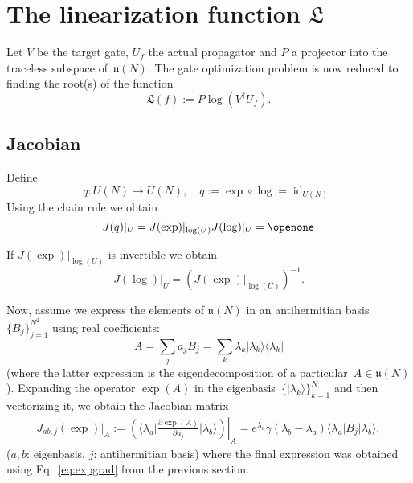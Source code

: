 \documentclass[aps,pra,12pt,showpacs,showkeys,nofootinbib,superscriptaddress,longbibliography]{revtex4}
\newcommand{\bra}[1]{\mbox{$\langle #1|$}}
\newcommand{\ket}[1]{\mbox{$|#1\rangle$}}
\newcommand{\ketbra}[2]{\mbox{$|#1\rangle\langle #2|$}}
\DeclareMathOperator{\id}{id} %
\newcommand{\I}{\openone}     %
\newcommand{\mf}[1]{\mathfrak{#1}}
\newcommand{\pde}[2]{\frac{\partial #1}{\partial #2}}
\newcommand{\be}{\begin{equation}}
\newcommand{\ee}{\end{equation}}
\begin{document}
\section{The linearization function $\mf{L}$}



Let $V$ be the target gate, $U_f$ the actual propagator and $P$ a
projector into the traceless subspace of~$\mf{u}(N)$. The gate
optimization problem is now reduced to finding the root(s) of the function
\be
\mf{L}(f) := P \log(V^\dagger U_f).
\ee




\subsection{Jacobian}


Define
\be
q: U(N) \to U(N), \quad q := \exp \circ \log = \id_{U(N)}.
\ee
Using the chain rule we obtain
\be
J(q)|_{U} = J(\exp)|_{\log(U)} J(\log)|_{U} = \I
\ee

If $J(\exp)|_{\log(U)}$ is invertible we obtain
\be
\label{eq:invJ}
J(\log)|_{U} =  (J(\exp)|_{\log(U)})^{-1}.
\ee

Now, assume we express the elements of
$\mf{u}(N)$
in an antihermitian basis~$\{B_j\}_{j=1}^{N^2}$ using real coefficients:
\be
A = \sum_j a_j B_j = \sum_k \lambda_k \ketbra{\lambda_k}{\lambda_k}
\ee
(where the latter expression is the eigendecomposition of a
particular~$A \in \mf{u}(N)$).
Expanding the operator $\exp(A)$ in the eigenbasis~$\{\ket{\lambda_k}\}_{k=1}^N$ and then vectorizing it, we
obtain the Jacobian matrix
\begin{align}
J_{ab,j}(\exp)|_A
:= \left.\left(\bra{\lambda_a}  \pde{\exp(A)}{a_j} \ket{\lambda_b} \right) \right|_A
= e^{\lambda_a} \gamma(\lambda_b - \lambda_a) \bra{\lambda_a} B_j \ket{\lambda_b},
\end{align}
($a,b$: eigenbasis, $j$: antihermitian basis)
where the final expression was obtained using Eq.~\eqref{eq:expgrad} from the previous section.
\end{document}
